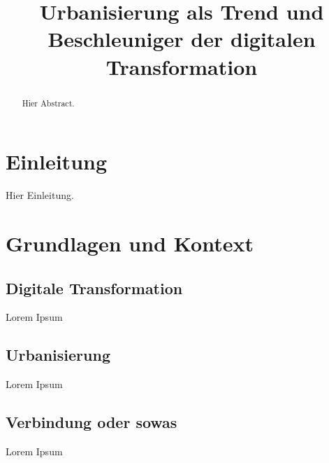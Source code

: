 \documentclass[conference,compsoc,final,a4paper, onecolumn, 11pt]{IEEEtran}
\newcommand{\dokumententitel}[0]{Urbanisierung als Trend und Beschleuniger der digitalen Transformation}
\begin{document}
\title{\dokumententitel}

\author{
  \and
  \and
}

\maketitle
\thispagestyle{plain}
\pagestyle{plain}

\begin{abstract}
Hier Abstract.
\end{abstract}

{\tableofcontents}


\section{Einleitung}
Hier Einleitung.


\section{Grundlagen und Kontext}
\subsection{Digitale Transformation}
Lorem Ipsum

\subsection{Urbanisierung}
Lorem Ipsum

\subsection{Verbindung oder sowas}
Lorem Ipsum


\end{document}
